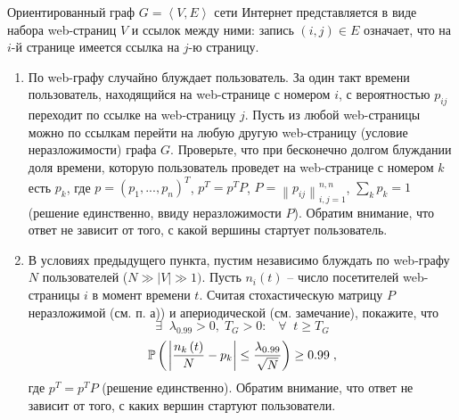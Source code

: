 \begin{problem}[PageRank] 
Ориентированный граф $G=\left\langle {V,E} \right\rangle$  сети Интернет представляется в виде набора web-страниц $V$ и ссылок между ними: запись $\left( {i,j} \right)\in E$ означает, что на $i$-й странице имеется ссылка на $j$-ю страницу. 

\begin{enumerate}

\item По web-графу случайно блуждает пользователь. За один такт 
времени пользователь, находящийся на web-странице с номером $i$, с вероятностью $p_{ij} $ переходит по ссылке на web-страницу $j$. 
Пусть из любой web-страницы можно по ссылкам перейти на любую другую 
web-страницу (условие неразложимости) графа $G$. Проверьте, что при бесконечно долгом блуждании доля времени, которую пользователь проведет на web-странице с номером $k$ есть $p_k $, где $ 
{p} =\left( {p_1 ,...,p_n } \right)^T $, ${p}^T = {p}^T P$, 
$P=\left\| {p_{ij} } \right\|_{i,j=1}^{n,n} $, $\sum_k p_k = 1$ (решение единственно,  ввиду неразложимости $P$). Обратим внимание, что ответ не зависит от того, с какой вершины стартует пользователь.

\item В условиях предыдущего пункта, пустим независимо блуждать по web-графу $N$ 
пользователей ($N\gg \left| V \right| \gg 1)$. Пусть $n_i \left( t \right)$ -- число посетителей web-страницы $i$ в момент времени $t$. Считая стохастическую матрицу $P$ неразложимой (см. п. а)) и апериодической (см. замечание), покажите, 
что
\[
\exists \;\;\lambda _{0.99} >0,\;T_G>0:\;\;\;\forall \;\;t\ge 
T_G
\]
\[
\mathrm{{\mathbb P}}\left( {\left. {\left| {\frac{n_k \left( t \right)}{N}-p_k } \right|\le 
\frac{\lambda _{0.99} }{\sqrt N }} \right)\ge 0.99} \right.,
\]
где $ {p}^T= {p}^T P$ (решение единственно). Обратим внимание, что ответ не зависит от того, с каких вершин стартуют пользователи.

\end{enumerate}

\end{problem}

